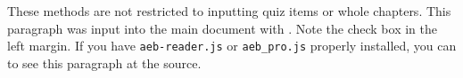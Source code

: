These methods are not restricted to inputting quiz items or whole
chapters. This paragraph was input into the main document with
. Note the check box in the left margin. If
you have \texttt{aeb-reader.js} or \texttt{aeb\_pro.js} properly installed, you can  to
see this paragraph at the source.

\endinput
